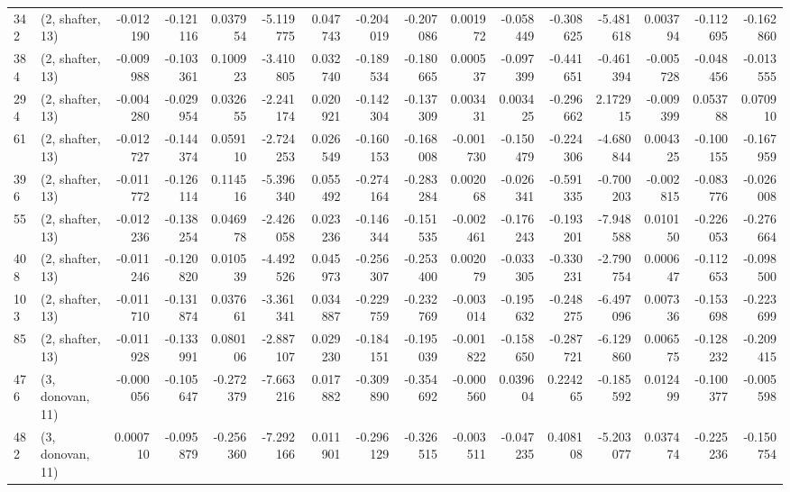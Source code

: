 \begin{tabular}{llrrrrrrrrrrrrrr}
342 &  (2, shafter, 13) &  -0.012190 & -0.121116 &  0.037954 &   -5.119775 &  0.047743 &  -0.204019 & -0.207086 &  0.001972 & -0.058449 & -0.308625 &   -5.481618 &  0.003794 & -0.112695 & -0.162860 \\
384 &  (2, shafter, 13) &  -0.009988 & -0.103361 &  0.100923 &   -3.410805 &  0.032740 &  -0.189534 & -0.180665 &  0.000537 & -0.097399 & -0.441651 &   -0.461394 & -0.005728 & -0.048456 & -0.013555 \\
294 &  (2, shafter, 13) &  -0.004280 & -0.029954 &  0.032655 &   -2.241174 &  0.020921 &  -0.142304 & -0.137309 &  0.003431 &  0.003425 & -0.296662 &    2.172915 & -0.009399 &  0.053788 &  0.070910 \\
61  &  (2, shafter, 13) &  -0.012727 & -0.144374 &  0.059110 &   -2.724253 &  0.026549 &  -0.160153 & -0.168008 & -0.001730 & -0.150479 & -0.224306 &   -4.680844 &  0.004325 & -0.100155 & -0.167959 \\
396 &  (2, shafter, 13) &  -0.011772 & -0.126114 &  0.114516 &   -5.396340 &  0.055492 &  -0.274164 & -0.283284 &  0.002068 & -0.026341 & -0.591335 &   -0.700203 & -0.002815 & -0.083776 & -0.026008 \\
55  &  (2, shafter, 13) &  -0.012236 & -0.138254 &  0.046978 &   -2.426058 &  0.023236 &  -0.146344 & -0.151535 & -0.002461 & -0.176243 & -0.193201 &   -7.948588 &  0.010150 & -0.226053 & -0.276664 \\
408 &  (2, shafter, 13) &  -0.011246 & -0.120820 &  0.010539 &   -4.492526 &  0.045973 &  -0.256307 & -0.253400 &  0.002079 & -0.033305 & -0.330231 &   -2.790754 &  0.000647 & -0.112653 & -0.098500 \\
103 &  (2, shafter, 13) &  -0.011710 & -0.131874 &  0.037661 &   -3.361341 &  0.034887 &  -0.229759 & -0.232769 & -0.003014 & -0.195632 & -0.248275 &   -6.497096 &  0.007336 & -0.153698 & -0.223699 \\
85  &  (2, shafter, 13) &  -0.011928 & -0.133991 &  0.080106 &   -2.887107 &  0.029230 &  -0.184151 & -0.195039 & -0.001822 & -0.158650 & -0.287721 &   -6.129860 &  0.006575 & -0.128232 & -0.209415 \\
476 &  (3, donovan, 11) &  -0.000056 & -0.105647 & -0.272379 &   -7.663216 &  0.017882 &  -0.309890 & -0.354692 & -0.000560 &  0.039604 &  0.224265 &   -0.185592 &  0.012499 & -0.100377 & -0.005598 \\
482 &  (3, donovan, 11) &   0.000710 & -0.095879 & -0.256360 &   -7.292166 &  0.011901 &  -0.296129 & -0.326515 & -0.003511 & -0.047235 &  0.408108 &   -5.203077 &  0.037474 & -0.225236 & -0.150754 \\

\end{tabular}
